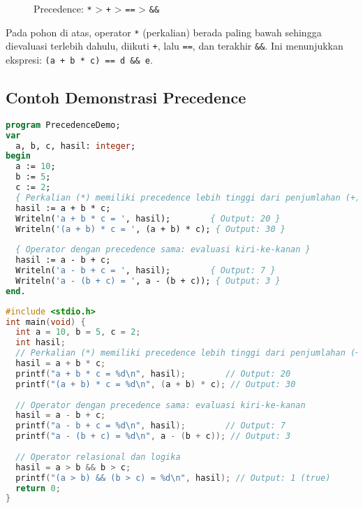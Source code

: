 \documentclass[../main.tex]{subfiles}
\begin{document}
\begin{figure}[H]
  \centering
  \caption{Precedence: \texttt{*} \textgreater{} \texttt{+} \textgreater{} \texttt{==} \textgreater{} \texttt{\&\&}}
\end{figure}

Pada pohon di atas, operator \texttt{*} (perkalian) berada paling bawah sehingga dievaluasi terlebih dahulu, diikuti \texttt{+}, lalu \texttt{==}, dan terakhir \texttt{\&\&}. Ini menunjukkan ekspresi: \texttt{(a + b * c) == d \&\& e}.

\subsection{Contoh Demonstrasi Precedence}
\begin{lstlisting}[language=Pascal, caption={Precedence operator di Pascal}]
program PrecedenceDemo;
var
  a, b, c, hasil: integer;
begin
  a := 10;
  b := 5;
  c := 2;
  { Perkalian (*) memiliki precedence lebih tinggi dari penjumlahan (+) }
  hasil := a + b * c;
  Writeln('a + b * c = ', hasil);        { Output: 20 }
  Writeln('(a + b) * c = ', (a + b) * c); { Output: 30 }
  
  { Operator dengan precedence sama: evaluasi kiri-ke-kanan }
  hasil := a - b + c;
  Writeln('a - b + c = ', hasil);        { Output: 7 }
  Writeln('a - (b + c) = ', a - (b + c)); { Output: 3 }
end.
\end{lstlisting}

\begin{lstlisting}[language=C, caption={Precedence operator di C}]
#include <stdio.h>
int main(void) {
  int a = 10, b = 5, c = 2;
  int hasil;
  // Perkalian (*) memiliki precedence lebih tinggi dari penjumlahan (+)
  hasil = a + b * c;
  printf("a + b * c = %d\n", hasil);        // Output: 20
  printf("(a + b) * c = %d\n", (a + b) * c); // Output: 30
  
  // Operator dengan precedence sama: evaluasi kiri-ke-kanan
  hasil = a - b + c;
  printf("a - b + c = %d\n", hasil);        // Output: 7
  printf("a - (b + c) = %d\n", a - (b + c)); // Output: 3
  
  // Operator relasional dan logika
  hasil = a > b && b > c;
  printf("(a > b) && (b > c) = %d\n", hasil); // Output: 1 (true)
  return 0;
}
\end{lstlisting}
\end{document}
